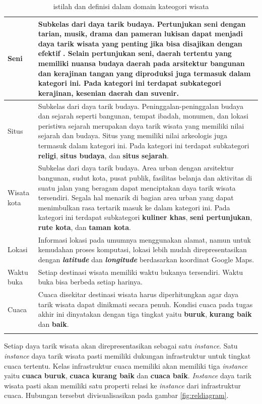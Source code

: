 \begin{center}
\begin{longtable}{ |l|m{10cm}| }
	\hline
	Seni & Subkelas dari daya tarik budaya. Pertunjukan seni dengan tarian, musik, drama dan pameran lukisan dapat menjadi daya tarik wisata yang
	penting jika bisa disajikan dengan efektif \cite{inskeep1991tourism}. Selain pertunjukan seni, daerah tertentu yang memiliki nuansa budaya
	daerah pada arsitektur bangunan dan kerajinan tangan yang diproduksi juga termasuk dalam kategori ini.
	Pada kategori ini terdapat subkategori \textbf{kerajinan}, \textbf{kesenian daerah} dan \textbf{suvenir}.\\
	\hline
	Situs & Subkelas dari daya tarik budaya. Peninggalan-peninggalan budaya dan sejarah seperti bangunan, tempat ibadah, monumen, 
	dan lokasi peristiwa sejarah merupakan daya tarik wisata yang memiliki nilai sejarah dan budaya. Situs yang memiliki nilai arkeologis juga termasuk
	dalam kategori ini.
	Pada kategori ini terdapat subkategori \textbf{religi}, \textbf{situs budaya}, dan \textbf{situs sejarah}.\\
	\hline
	Wisata kota & Subkelas dari daya tarik budaya. Area urban dengan arsitektur bangunan, sudut kota, pusat publik, fasilitas belanja dan aktivitas di suatu jalan
	yang beragam dapat menciptakan daya tarik wisata tersendiri. Segala hal menarik di bagian area urban yang dapat menimbulkan rasa tertarik
	masuk ke dalam kategori ini. Pada kategori ini terdapat subkategori \textbf{kuliner khas}, \textbf{seni pertunjukan}, \textbf{rute kota},
	dan \textbf{taman kota}.\\
	\hline
	Lokasi & Informasi lokasi pada umumnya menggunakan alamat, namun untuk kemudahan proses komputasi, lokasi lebih mudah direpresentasikan
	dengan \textit{\textbf{latitude}} dan \textit{\textbf{longitude}} berdasarkan koordinat Google Maps.\\
	\hline
	Waktu buka & Setiap destinasi wisata memiliki waktu bukanya tersendiri. Waktu buka bisa berbeda setiap harinya. \\ 
	\hline
	Cuaca & Cuaca disekitar destinasi wisata harus diperhitungkan agar daya tarik wisata dapat dinikmati secara penuh. Kondisi cuaca pada tugas akhir ini
	dinyatakan dengan tiga tingkat yaitu \textbf{buruk}, \textbf{kurang baik} dan \textbf{baik}.\\ 
	\hline
\caption{istilah dan definisi dalam domain kateogori wisata}
\label{table:concept-table}
\end{longtable}
\end{center}

Setiap daya tarik wisata akan direpresentasikan sebagai satu \textit{instance}. Satu \textit{instance} daya tarik wisata pasti memiliki
dukungan infrastruktur untuk tingkat cuaca tertentu. Kelas infrastruktur cuaca memiliki akan memiliki tiga \textit{instance} yaitu \textbf{cuaca buruk}, 
\textbf{cuaca kurang baik} dan \textbf{cuaca baik}.
\textit{Instance} daya tarik wisata pasti akan memiliki satu properti relasi ke \textit{instance} dari infrastruktur cuaca. Hubungan tersebut
divisualisasikan pada gambar \ref{fig:reldiagram}.
 
